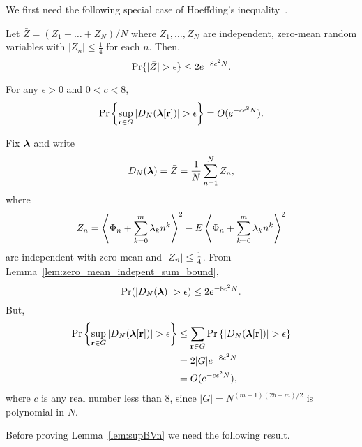 \documentclass[journal]{IEEEtran}
\begin{document}
We first need the following special case of Hoeffding's inequality~\cite{Hoeffding_inequality_1963}.

\begin{lemma} \label{lem:zero_mean_indepent_sum_bound}
  Let $\bar{Z} = (Z_1 + \dots + Z_N)/N$ where $Z_1, \dots, Z_N$ are independent, zero-mean random variables with $|Z_n| \leq \tfrac{1}{4}$ for each $n$.  Then,
\[
  \operatorname{Pr}\{ \vert \bar{Z} \vert > \epsilon \} \leq 2e^{ - 8 \epsilon^2 N}.
\]
\end{lemma}

\begin{lemma}\label{lem:supVjk}
For any $\epsilon > 0$ and $0 < c < 8$,
\[
\operatorname{Pr}{\left\{    \sup_{\mathbf{r} \in G}\left\vert  D_N(\boldsymbol{\lambda}[\mathbf{r}])   \right\vert > \epsilon  \right\}} = O(e^{-c \epsilon^2 N}).
\]
\end{lemma}
 \begin{IEEEproof}
Fix $\boldsymbol{\lambda}$ and write
 \[
 D_N(\boldsymbol{\lambda}) = \bar{Z} = \frac{1}{N}  \sum_{n=1}^{N}Z_{n},
 \]
 where
 \[
 Z_{n}=\left\langle   \Phi_n+\sum_{k = 0}^{m}{\lambda_k n^k}  \right\rangle^{2} - E\left\langle   \Phi_n + \sum_{k = 0}^{m}{\lambda_k n^k}  \right\rangle^{2}
 \]
 are independent with zero mean and $\left\vert Z_n \right\vert \leq \tfrac{1}{4}$. From Lemma~\ref{lem:zero_mean_indepent_sum_bound},
 \begin{equation}
  \prob( \abs{D_N(\lambdabf)} > \epsilon ) \leq 2e^{ - 8 \epsilon^2 N}.
 \label{eq:markapp}%
 \end{equation}
But,
 \begin{align*}
 \prob\cubr{  \sup_{\rbf\in G}\left\vert D_N(\lambdabf[\rbf]) \right\vert >\epsilon }  &\leq \sum_{\rbf \in G} \prob\scubr{  \left\vert D_N(\lambdabf[\rbf])  \right\vert >\epsilon } \nonumber \\
&= 2 |G| e^{ - 8 \epsilon^2 N} \nonumber \\
&= O(e^{-c \epsilon^2 N}), \label{eq:betaprobconv}
\end{align*}
where $c$ is any real number less than $8$, since $|G| = N^{(m+1)(2b + m)/2}$ is polynomial in $N$.
\end{IEEEproof}

Before proving Lemma~\ref{lem:supBVn} we need the following result.
\end{document}
